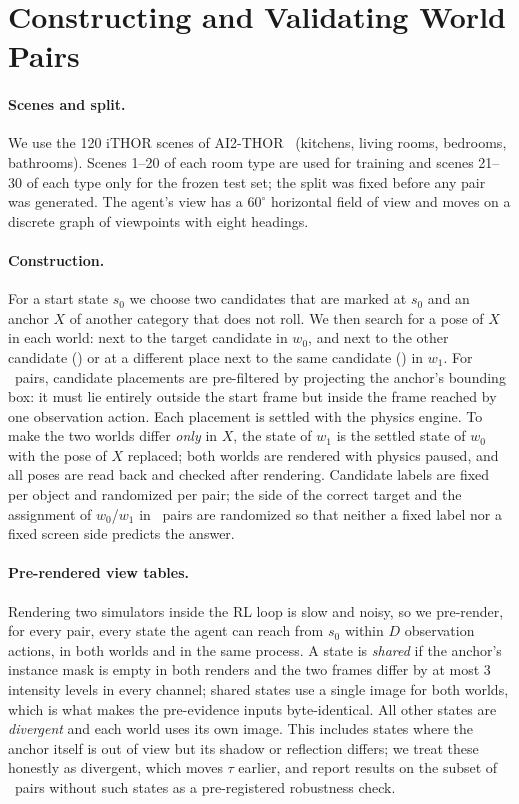 \section{Constructing and Validating World Pairs}
\label{sec:data}

\paragraph{Scenes and split.}
We use the 120 iTHOR scenes of AI2-THOR~\cite{ai2thor2017} (kitchens, living rooms, bedrooms, bathrooms).
Scenes 1--20 of each room type are used for training and scenes 21--30 of each type only for the frozen test set; the split was fixed before any pair was generated.
The agent's view has a $60^\circ$ horizontal field of view and moves on a discrete graph of viewpoints with eight headings.

\paragraph{Construction.}
For a start state $s_0$ we choose two candidates that are marked at $s_0$ and an anchor $X$ of another category that does not roll.
We then search for a pose of $X$ in each world: next to the target candidate in $w_0$, and next to the other candidate (\Flip) or at a different place next to the same candidate (\Stay) in $w_1$.
For \Look\ pairs, candidate placements are pre-filtered by projecting the anchor's bounding box: it must lie entirely outside the start frame but inside the frame reached by one observation action.
Each placement is settled with the physics engine.
To make the two worlds differ \emph{only} in $X$, the state of $w_1$ is the settled state of $w_0$ with the pose of $X$ replaced; both worlds are rendered with physics paused, and all poses are read back and checked after rendering.
Candidate labels are fixed per object and randomized per pair; the side of the correct target and the assignment of $w_0$/$w_1$ in \Flip\ pairs are randomized so that neither a fixed label nor a fixed screen side predicts the answer.

\paragraph{Pre-rendered view tables.}
Rendering two simulators inside the RL loop is slow and noisy, so we pre-render, for every pair, every state the agent can reach from $s_0$ within $D$ observation actions, in both worlds and in the same process.
A state is \emph{shared} if the anchor's instance mask is empty in both renders and the two frames differ by at most $3$ intensity levels in every channel; shared states use a single image for both worlds, which is what makes the pre-evidence inputs byte-identical.
All other states are \emph{divergent} and each world uses its own image.
This includes states where the anchor itself is out of view but its shadow or reflection differs; we treat these honestly as divergent, which moves $\tau$ earlier, and report results on the subset of \Look\ pairs without such states as a pre-registered robustness check.

